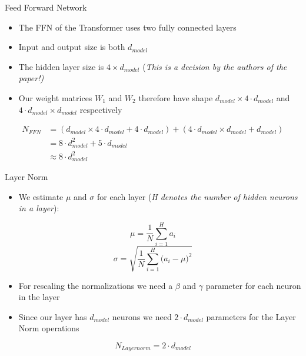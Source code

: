 \documentclass[11pt,compress,t,notes=noshow, xcolor=table]{beamer}
\begin{document}

\begin{frame}{Feed Forward Network}
    \begin{itemize}
        \item The FFN of the Transformer uses two fully connected layers
        \item Input and output size is both $d_{model}$
        \item The hidden layer size is $4 \times d_{model}$ (\textit{This is a decision by the authors of the paper!)}
        \item Our weight matrices $W_1$ and $W_2$ therefore have shape $d_{model} \times 4\cdot d_{model}$ and $4\cdot d_{model} \times d_{model}$ respectively
    \end{itemize}
    
    \begin{align*}
    N_{FFN} &= (d_{model} \times 4\cdot d_{model} +4\cdot d_{model}) + (4\cdot d_{model} \times d_{model} + d_{model}) \\
    &= 8\cdot d_{model}^2 + 5\cdot d_{model} \\
    &\approx 8\cdot d_{model}^2    
    \end{align*}
\end{frame}


\begin{frame}{Layer Norm}

\begin{itemize}
    \item We estimate $\mu$ and $\sigma$ for each layer (\textit{H denotes the number of hidden neurons in a layer}):
\end{itemize}
$$\mu = \frac{1}{N} \sum^{H}_{i=1}a_{i}$$
$$\sigma = \sqrt{\frac{1}{N} \sum^{H}_{i=1}{(a_{i}-\mu})^2}$$

\begin{itemize}
    \item For rescaling the normalizations we need a $\beta$ and $\gamma$ parameter for each neuron in the layer
    \item Since our layer has $d_{model}$ neurons we need $2\cdot d_{model}$ parameters for the Layer Norm operations
\end{itemize}

$$N_{Layernorm} = 2\cdot d_{model}$$
    
\end{frame}
\end{document}
